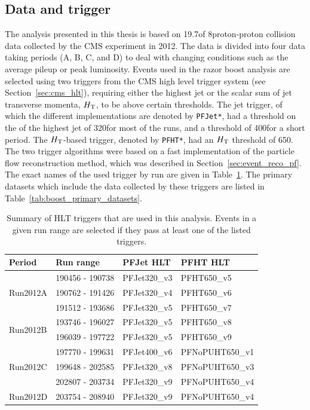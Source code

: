 
\subsection{Data and trigger \label{sec:boost_data_trigger}}

The analysis presented in this thesis is based on 19.7\fbinv of 8\TeV proton-proton collision data
collected by the CMS experiment in 2012.  The data is divided into four data taking periods
(A, B, C, and D) to deal with changing conditions such as the average pileup or peak luminosity. 
Events used in the razor boost analysis are selected using two triggers from the CMS high
level trigger system (see Section~\ref{sec:cms_hlt}), requiring either the highest jet \pt or the
scalar sum of jet transverse momenta, $H_{\mathrm{T}}$, to be above certain thresholds. 
The jet \pt trigger, of which the different implementations are denoted by \texttt{PFJet*},
had a threshold on the \pt of the highest \pt jet of 320\GeV for most of the runs, and a threshold
of 400\GeV for a short period. 
The $H_{\mathrm{T}}$-based trigger, denoted by \texttt{PFHT*}, had an $H_{\mathrm{T}}$ threshold of 650\GeV. 
The two trigger algorithms were based on a fast implementation of the particle flow 
reconstruction method, which was described in Section~\ref{sec:event_reco_pf}.  
The exact names of the used trigger by run are given in Table~\ref{tab:boost_triggers}. The primary
datasets which include the data collected by these triggers are listed in
Table~\ref{tab:boost_primary_datasets}. 

\begin{table}[htdp]
\caption{Summary of HLT triggers that are used in this analysis. Events in a given run range
are selected if they pass at least one of the listed triggers. }	
\begin{center}
\begin{tabular}{l l l l}
\toprule
Period & Run range & PFJet HLT & PFHT HLT \\
\midrule
\multirow{3}{*}{Run2012A} & 190456 - 190738 & PFJet320\_v3 & PFHT650\_v5 \\
& 190762 - 191426 & PFJet320\_v4 & PFHT650\_v6 \\
& 191512 - 193686 & PFJet320\_v5 & PFHT650\_v7 \\
\midrule
\multirow{2}{*}{Run2012B} & 193746 - 196027 & PFJet320\_v5 & PFHT650\_v8 \\
& 196039 - 197722 & PFJet320\_v5 & PFHT650\_v9 \\
\midrule
\multirow{3}{*}{Run2012C} & 197770 - 199631 & PFJet400\_v6 & PFNoPUHT650\_v1 \\
& 199648 - 202585 & PFJet320\_v8 & PFNoPUHT650\_v3 \\
& 202807 - 203734 & PFJet320\_v9 & PFNoPUHT650\_v4 \\
\midrule
Run2012D & 203754 - 208940 & PFJet320\_v9 & PFNoPUHT650\_v4 \\
\bottomrule
\end{tabular}
\end{center}
\label{tab:boost_triggers}
\end{table}

